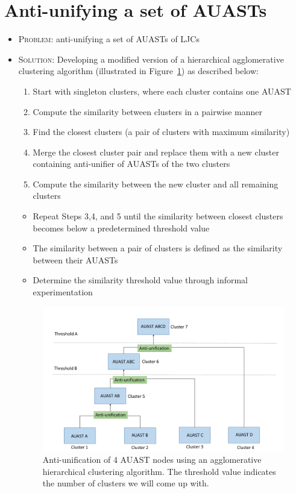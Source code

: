 \section{Anti-unifying a set of AUASTs} \label{meth-clustering}
\begin{itemize} [leftmargin=.1in]
\item \textsc{Problem: } anti-unifying a set of AUASTs of LJCs
\item \textsc{Solution: }Developing a modified version of a hierarchical agglomerative clustering algorithm (illustrated in Figure~\ref{fig:overview2}) as described below: 
\begin{enumerate} [leftmargin=.3in]
\item Start with singleton clusters, where each cluster contains one AUAST 
\item Compute the similarity between clusters in a pairwise manner 
\item Find the closest clusters (a pair of clusters with maximum  similarity)
\item Merge the closest cluster pair and replace them with a new cluster containing anti-unifier of AUASTs of the two clusters 
\item Compute the similarity between the new cluster and all remaining clusters 
\end{enumerate}
\begin{itemize} [leftmargin=.3in]
\item Repeat Steps 3,4, and 5 until the similarity between closest clusters becomes below a predetermined threshold value
\item The similarity between a pair of clusters is defined as the similarity between their AUASTs 
\item Determine the similarity threshold value through informal experimentation 
\end{itemize}
\begin{figure} [H]
  \centering\includegraphics [width = \textwidth]{Drawing4/overview2.pdf}
  \caption{Anti-unification of 4 AUAST nodes using an agglomerative hierarchical clustering algorithm. The threshold value indicates the number of clusters we will come up with.}
  \label{fig:overview2}
\end{figure}
\end{itemize} 

